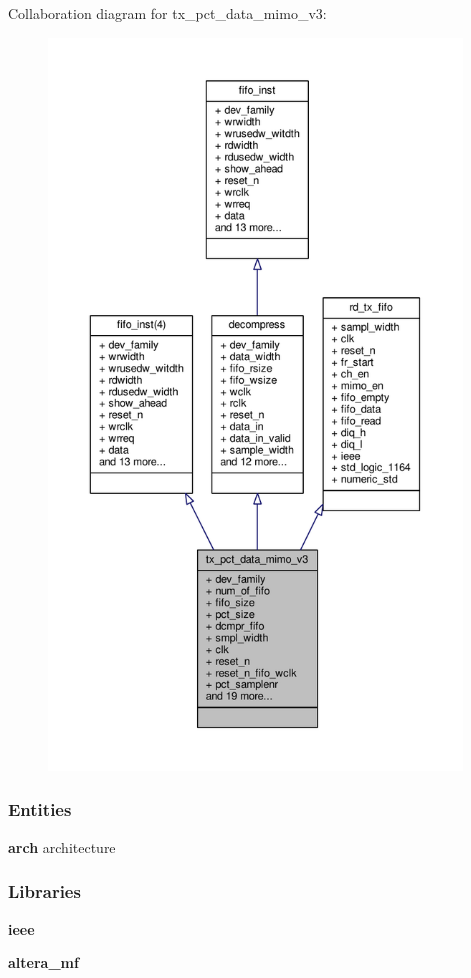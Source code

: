Collaboration diagram for tx\+\_\+pct\+\_\+data\+\_\+mimo\+\_\+v3\+:\nopagebreak
\begin{figure}[H]
\begin{center}
\leavevmode
\includegraphics[height=550pt]{d4/d4b/classtx__pct__data__mimo__v3__coll__graph}
\end{center}
\end{figure}
\subsubsection*{Entities}
\begin{DoxyCompactItemize}
\item 
{\bf arch} architecture
\end{DoxyCompactItemize}
\subsubsection*{Libraries}
 \begin{DoxyCompactItemize}
\item 
{\bf ieee} 
\item 
{\bf altera\+\_\+mf} 
\end{DoxyCompactItemize}
